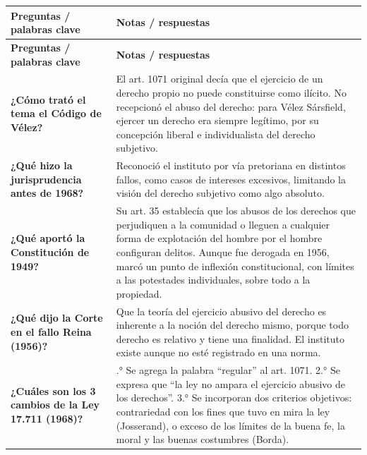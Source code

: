 \documentclass[12pt,oneside]{book}
\begin{document}
\begin{longtable}{
    >{\raggedright\arraybackslash}p{}
    >{\raggedright\arraybackslash}p{}
}
\toprule
\textbf{Preguntas / palabras clave} & \textbf{Notas / respuestas} \\
\midrule
\endfirsthead
\toprule
\textbf{Preguntas / palabras clave} & \textbf{Notas / respuestas} \\
\midrule
\endhead
\bottomrule
\endfoot

\textbf{¿Cómo trató el tema el Código de Vélez?} &
El art. 1071 original decía que el ejercicio de un derecho propio no puede constituirse como ilícito. No recepcionó el abuso del derecho: para Vélez Sársfield, ejercer un derecho era siempre legítimo, por su concepción liberal e individualista del derecho subjetivo. \\[0.8em]

\textbf{¿Qué hizo la jurisprudencia antes de 1968?} &
Reconoció el instituto por vía pretoriana en distintos fallos, como casos de intereses excesivos, limitando la visión del derecho subjetivo como algo absoluto. \\[0.8em]

\textbf{¿Qué aportó la Constitución de 1949?} &
Su art. 35 establecía que los abusos de los derechos que perjudiquen a la comunidad o lleguen a cualquier forma de explotación del hombre por el hombre configuran delitos. Aunque fue derogada en 1956, marcó un punto de inflexión constitucional, con límites a las potestades individuales, sobre todo a la propiedad. \\[0.8em]

\textbf{¿Qué dijo la Corte en el fallo Reina (1956)?} &
Que la teoría del ejercicio abusivo del derecho es inherente a la noción del derecho mismo, porque todo derecho es relativo y tiene una finalidad. El instituto existe aunque no esté registrado en una norma. \\[0.8em]

\textbf{¿Cuáles son los 3 cambios de la Ley 17.711 (1968)?} &
1.° Se agrega la palabra ``regular'' al art. 1071. 2.° Se expresa que ``la ley no ampara el ejercicio abusivo de los derechos''. 3.° Se incorporan dos criterios objetivos: contrariedad con los fines que tuvo en mira la ley (Josserand), o exceso de los límites de la buena fe, la moral y las buenas costumbres (Borda). \\[0.8em]


\end{longtable}
\end{document}

